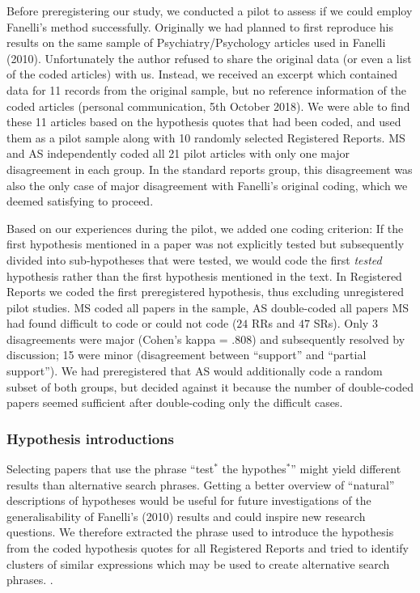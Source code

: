 \documentclass[british,,jou,floatsintext]{apa6}
\begin{document}
Before preregistering our study, we conducted a pilot to assess if we could employ Fanelli's method successfully.
Originally we had planned to first reproduce his results on the same sample of Psychiatry/Psychology articles used in Fanelli (2010).
Unfortunately the author refused to share the original data (or even a list of the coded articles) with us.
Instead, we received an excerpt which contained data for 11 records from the original sample, but no reference information of the coded articles (personal communication, 5th October 2018).
We were able to find these 11 articles based on the hypothesis quotes that had been coded, and used them as a pilot sample along with 10 randomly selected Registered Reports.
MS and AS independently coded all 21 pilot articles with only one major disagreement in each group.
In the standard reports group, this disagreement was also the only case of major disagreement with Fanelli's original coding, which we deemed satisfying to proceed.

Based on our experiences during the pilot, we added one coding criterion:
If the first hypothesis mentioned in a paper was not explicitly tested but subsequently divided into sub-hypotheses that were tested, we would code the first \emph{tested} hypothesis rather than the first hypothesis mentioned in the text.
In Registered Reports we coded the first preregistered hypothesis, thus excluding unregistered pilot studies.
MS coded all papers in the sample, AS double-coded all papers MS had found difficult to code or could not code (\(24\) RRs and \(47\) SRs).
Only 3 disagreements were major (Cohen's kappa = .808) and subsequently resolved by discussion; 15 were minor (disagreement between \enquote{support} and \enquote{partial support}).
We had preregistered that AS would additionally code a random subset of both groups, but decided against it because the number of double-coded papers seemed sufficient after double-coding only the difficult cases.

\hypertarget{hypothesis-introductions}{%
\subsubsection{Hypothesis introductions}\label{hypothesis-introductions}}

Selecting papers that use the phrase \enquote{test\(^\ast\) the hypothes\(^\ast\)} might yield different results than alternative search phrases.
Getting a better overview of \enquote{natural} descriptions of hypotheses would be useful for future investigations of the generalisability of Fanelli's (2010) results and could inspire new research questions.
We therefore extracted the phrase used to introduce the hypothesis from the coded hypothesis quotes for all Registered Reports and tried to identify clusters of similar expressions which may be used to create alternative search phrases. .
\end{document}
